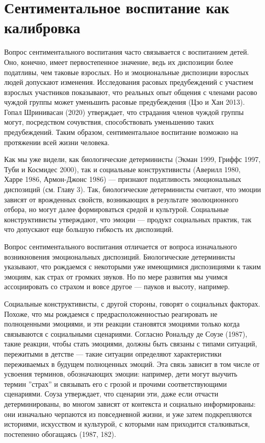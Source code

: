 \documentclass[11pt]{book}
\begin{document}
\section{Сентиментальное воспитание как калибровка}

Вопрос сентиментального воспитания часто связывается с воспитанием детей. Оно, конечно, имеет первостепенное значение, ведь их диспозиции более податливы, чем таковые взрослых. Но и эмоциональные диспозиции взрослых людей допускают изменения. Исследования расовых предубеждений с участием взрослых участников показывают, что реальных опыт общения с членами расово чуждой группы может уменьшить расовые предубеждения (Цзо и Хан 2013). Гопал Шринивасан (2020) утверждает, что страдания членов чуждой группы могут, посредством сочувствия, способствовать уменьшению таких предубеждений. Таким образом, сентиментальное воспитание возможно на протяжении всей жизни человека.

Как мы уже видели, как биологические детерминисты (Экман 1999, Гриффс 1997, Туби и Космидес 2000), так и социальные конструктивисты (Аверилл 1980, Харре 1986, Армон-Джонс 1986) --- признают податливость эмоциональных диспозиций (см. Главу 3). Так, биологические детерминисты считают, что эмоции зависят от врожденных свойств, возникающих в результате эволюционного отбора, но могут далее формироваться средой и культурой. Социальные конструктивисты утверждают, что эмоции --- продукт социальных практик, так что допускают еще большую гибкость их диспозиций.

Вопрос сентиментального воспитания отличается от вопроса изначального возникновения эмоциональных диспозиций. Биологические детерминисты указывают, что рождаемся с некоторыми уже имеющимися диспозициями к таким эмоциям, как страх от громких звуков. Но по мере развития мы учимся ассоциировать со страхом и вовсе другое --- пауков и высоту, например.

Социальные конструктивисты, с другой стороны, говорят о социальных факторах. Похоже, что мы рождаемся с предрасположенностью реагировать не полноценными эмоциями, и эти реакции становятся эмоциями только когда связываются с социальными сценариями. Согласно Рональду де Соузе (1987), такие реакции, чтобы стать эмоциями, должны быть связаны с типами ситуаций, пережитыми в детстве --- такие ситуации определяют характеристики переживаемых в будущем полноценных эмоций. Эта связь зависит в том числе от усвоения терминов, обозначающих эмоции: например, дети могут выучить термин ''страх'' и связывать его с грозой и прочими соответствующими сценариями. Соуза утверждает, что сценарии эти, даже если отчасти детерминированы, во многом зависят от контекста и социально информированы: они изначально черпаются из повседневной жизни, и уже затем подкрепляются историями, искусством и культурой, с которыми нам приходится сталкиваться, постепенно обогащаясь (1987, 182).
\end{document}
